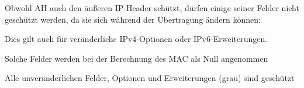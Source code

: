 \documentclass[a4paper]{article}
\begin{document}
\begin{multicols}{3}
\begin{itemize*}
            \item Obwohl AH auch den äußeren IP-Header schützt, dürfen einige seiner Felder nicht geschützt werden, da sie sich während der Übertragung ändern können:
            \begin{itemize*}
                  \item Dies gilt auch für veränderliche IPv4-Optionen oder IPv6-Erweiterungen.
                  \item Solche Felder werden bei der Berechnung des MAC als Null angenommen
            \end{itemize*}
            \item Alle unveränderlichen Felder, Optionen und Erweiterungen (grau) sind geschützt
      \end{itemize*}


\end{multicols}
\end{document}
